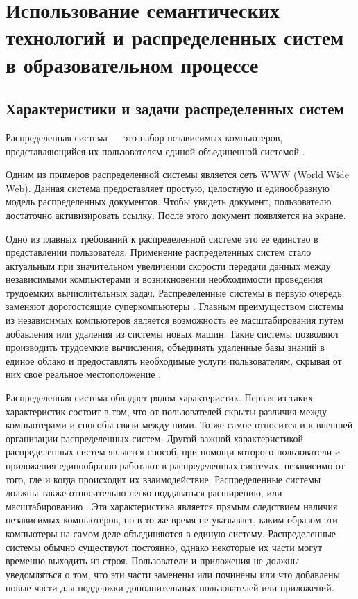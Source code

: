 \chapter{Использование семантических технологий и распределенных систем в образовательном процессе} \label{chapt1}




\section{Характеристики и задачи распределенных систем} \label{sect1_1}

Распределенная система — это набор независимых компьютеров, представляющийся их пользователям единой объединенной системой \cite{tanenboum2003raspr}.

Одним из примеров  распределенной системы является сеть WWW (World Wide Web). Данная система предоставляет простую, целостную и единообразную модель распределенных документов. Чтобы увидеть документ, пользователю достаточно активизировать ссылку. После этого документ появляется на экране. 

Одно из главных требований к распределенной системе это ее единство в представлении пользователя. Применение распределенных систем стало актуальным при значительном увеличении скорости передачи данных между независимыми компьютерами и возникновении необходимости проведения трудоемких вычислительных задач. Распределенные системы в первую очередь заменяют дорогостоящие суперкомпьютеры \cite{shokin1998raspr}. Главным преимуществом системы из независимых компьютеров является возможность ее масштабирования путем добавления или удаления из системы новых машин. Такие системы позволяют производить трудоемкие вычисления, объединять удаленные базы знаний в единое облако и предоставлять необходимые услуги пользователям, скрывая от них свое реальное местоположение \cite{wang2010distributed}.

Распределенная система обладает рядом характеристик. Первая из таких характеристик состоит в том, что от пользователей скрыты различия между компьютерами и способы связи между ними. То же самое относится и к внешней организации распределенных систем. Другой важной характеристикой распределенных систем является способ, при помощи которого пользователи и приложения единообразно работают в распределенных системах, независимо от того, где и когда происходит их взаимодействие. Распределенные системы должны также относительно легко поддаваться расширению, или масштабированию \cite{coulouris2005distributed}. Эта характеристика является прямым следствием наличия независимых компьютеров, но в то же время не указывает, каким образом эти компьютеры на самом деле объединяются в единую систему. Распределенные системы обычно существуют постоянно, однако некоторые их части могут временно выходить из строя. Пользователи и приложения не должны уведомляться о том, что эти части заменены или починены или что добавлены новые части для поддержки дополнительных пользователей или приложений.

